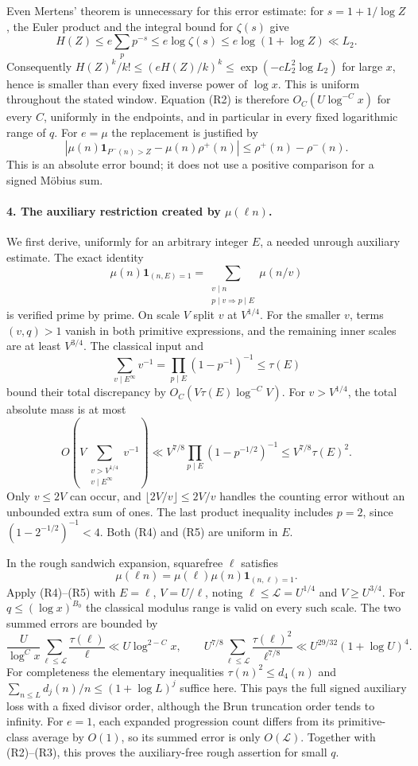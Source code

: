 Even Mertens' theorem is unnecessary for this error estimate: for
$s=1+1/\log Z$, the Euler product and the integral bound for $\zeta(s)$
give
\[
 H(Z)\le e\sum_p p^{-s}\le e\log\zeta(s)
 \le e\log(1+\log Z)\ll L_2.
\]
Consequently $H(Z)^k/k!\le(eH(Z)/k)^k\le
\exp(-cL_2^2\log L_2)$ for large $x$, hence is smaller than every
fixed inverse power of $\log x$. This is uniform throughout the stated
window. Equation (R2) is therefore $O_C(U\log^{-C}x)$ for every $C$,
uniformly in the endpoints, and in particular in every fixed
logarithmic range of $q$. For $e=\mu$ the replacement is justified by
\[
 |\mu(n)\mathbf1_{P^-(n)>Z}-\mu(n)\rho^+(n)|
 \le\rho^+(n)-\rho^-(n).                                  \tag{R3}
\]
This is an absolute error bound; it does not use a positive comparison
for a signed M\"obius sum.

\paragraph{4. The auxiliary restriction created by $\mu(\ell n)$.}
We first derive, uniformly for an arbitrary integer $E$, a needed
unrough auxiliary estimate. The exact identity
\[
 \mu(n)\mathbf1_{(n,E)=1}
   =\sum_{\substack{v\mid n\\p\mid v\Rightarrow p\mid E}}\mu(n/v)
                                                               \tag{R4}
\]
is verified prime by prime. On scale $V$ split $v$ at $V^{1/4}$.
For the smaller $v$, terms $(v,q)>1$ vanish in both primitive
expressions, and the remaining inner scales are at least $V^{3/4}$.
The classical input and
\[
 \sum_{v\mid E^\infty}v^{-1}
 =\prod_{p\mid E}(1-p^{-1})^{-1}\le\tau(E)
\]
bound their total discrepancy by $O_C(V\tau(E)\log^{-C}V)$.
For $v>V^{1/4}$, the total absolute mass is at most
\[
 O\left(V\sum_{\substack{v>V^{1/4}\\v\mid E^\infty}}v^{-1}\right)
 \ll V^{7/8}\prod_{p\mid E}(1-p^{-1/2})^{-1}
 \le V^{7/8}\tau(E)^2.                                    \tag{R5}
\]
Only $v\le2V$ can occur, and $\lfloor2V/v\rfloor\le2V/v$ handles
the counting error without an unbounded extra sum of ones. The last
product inequality includes $p=2$, since
$(1-2^{-1/2})^{-1}<4$. Both (R4) and (R5) are uniform in $E$.

In the rough sandwich expansion, squarefree $\ell$ satisfies
\[
 \mu(\ell n)=\mu(\ell)\mu(n)\mathbf1_{(n,\ell)=1}.
\]
Apply (R4)--(R5) with $E=\ell$, $V=U/\ell$, noting
$\ell\le\mathcal L=U^{1/4}$ and $V\ge U^{3/4}$.
For $q\le(\log x)^{B_0}$ the classical modulus range is valid on
every such scale. The two summed errors are bounded by
\[
 \frac{U}{\log^C x}\sum_{\ell\le\mathcal L}\frac{\tau(\ell)}\ell
 \ll U\log^{2-C}x,
 \qquad
 U^{7/8}\sum_{\ell\le\mathcal L}\frac{\tau(\ell)^2}{\ell^{7/8}}
 \ll U^{29/32}(1+\log U)^4.                                \tag{R6}
\]
For completeness the elementary inequalities
$\tau(n)^2\le d_4(n)$ and
$\sum_{n\le L}d_j(n)/n\le(1+\log L)^j$ suffice here.
This pays the full signed auxiliary loss with a fixed divisor order,
although the Brun truncation order tends to infinity.
For $e=1$, each expanded progression count differs from its
primitive-class average by $O(1)$, so its summed error is only
$O(\mathcal L)$. Together with (R2)--(R3), this proves the
auxiliary-free rough assertion for small $q$.


